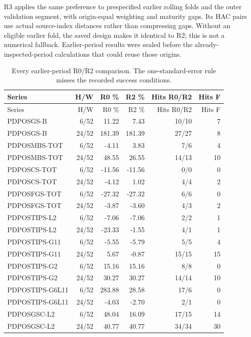 \documentclass[11pt,a4paper]{article}
\begin{document}
R3 applies the same preference to prespecified earlier rolling folds and the
outer validation segment, with origin-equal weighting and maturity gaps.
Its HAC pairs use actual source-index distances rather than compressing gaps.
Without an eligible earlier fold, the saved design makes it identical to R2;
this is not a numerical fallback. Earlier-period results were sealed before
the already-inspected-period calculations that could reuse those origins.
\begingroup
\scriptsize
\setlength{\tabcolsep}{3pt}
\renewcommand{\arraystretch}{1.12}
\begin{longtable}{p{35mm}rrrrr}
\caption{Every earlier-period R0/R2 comparison. The one-standard-error rule misses the recorded success conditions.}\\
\toprule
Series & H/W & R0 \% & R2 \% & Hits R0/R2 & Hits F \\
\midrule
\endfirsthead
\toprule
Series & H/W & R0 \% & R2 \% & Hits R0/R2 & Hits F \\
\midrule
\endhead
\bottomrule
\endfoot
PDPOSGS-B & 6/52 & 11.22 & 7.43 & 10/10 & 7 \\
PDPOSGS-B & 24/52 & 181.39 & 181.39 & 27/27 & 8 \\
PDPOSMBS-TOT & 6/52 & -4.11 & 3.83 & 7/6 & 4 \\
PDPOSMBS-TOT & 24/52 & 48.55 & 26.55 & 14/13 & 10 \\
PDPOSCS-TOT & 6/52 & -11.56 & -11.56 & 0/0 & 0 \\
PDPOSCS-TOT & 24/52 & -4.12 & 1.02 & 4/4 & 2 \\
PDPOSFGS-TOT & 6/52 & -27.32 & -27.32 & 6/6 & 0 \\
PDPOSFGS-TOT & 24/52 & -3.87 & -3.60 & 4/3 & 2 \\
PDPOSTIPS-L2 & 6/52 & -7.06 & -7.06 & 2/2 & 1 \\
PDPOSTIPS-L2 & 24/52 & -23.33 & -1.55 & 4/1 & 1 \\
PDPOSTIPS-G11 & 6/52 & -5.55 & -5.79 & 5/5 & 4 \\
PDPOSTIPS-G11 & 24/52 & 5.67 & -0.87 & 15/15 & 15 \\
PDPOSTIPS-G2 & 6/52 & 15.16 & 15.16 & 8/8 & 0 \\
PDPOSTIPS-G2 & 24/52 & 30.27 & 30.27 & 14/14 & 10 \\
PDPOSTIPS-G6L11 & 6/52 & 283.88 & 28.58 & 17/6 & 0 \\
PDPOSTIPS-G6L11 & 24/52 & -4.03 & -2.70 & 2/1 & 0 \\
PDPOSGSC-L2 & 6/52 & 48.04 & 16.09 & 17/15 & 14 \\
PDPOSGSC-L2 & 24/52 & 40.77 & 40.77 & 34/34 & 30 \\

\end{longtable}
\end{document}
